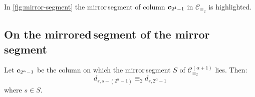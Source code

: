
In \autoref{fig:mirror-segment} the \flqq mirror\frqq\,segment of column $\boldsymbol{c}_{2^{4}-1}$ 
in $\mathcal{C}_{\equiv_{2}}$ is highlighted.

\subsection{On the \flqq mirrored\frqq\,segment of the \flqq mirror\frqq\, segment}


\begin{theorem}
    Let $\boldsymbol{c}_{2^{\alpha}-1}$ be the column on which 
    the \flqq mirror\frqq\,segment $S$ of 
    $\mathcal{C}_{\equiv_{2}}^{(\alpha+1)}$ lies. Then:
    \begin{equation}
        d_{s,s-(2^{\alpha}-1)}\equiv_{2}d_{s,2^{\alpha}-1}
    \end{equation}
    where $s\in S$.
\end{theorem}

